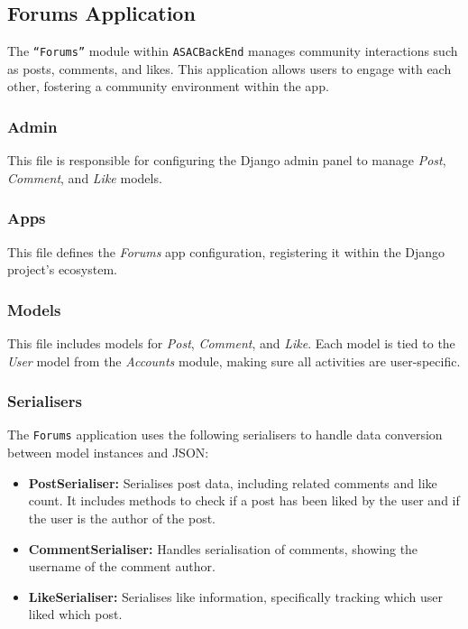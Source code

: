 \subsection{Forums Application}

The \texttt{``Forums''} module within \texttt{ASACBackEnd} manages community interactions such as posts, comments, and likes. This application allows users to engage with each other, fostering a community environment within the app.

\subsubsection{Admin}

This file is responsible for configuring the Django admin panel to manage \textit{Post}, \textit{Comment}, and \textit{Like} models.

\subsubsection{Apps}

This file defines the \textit{Forums} app configuration, registering it within the Django project's ecosystem.

\subsubsection{Models} 

This file includes models for \textit{Post}, \textit{Comment}, and \textit{Like}. Each model is tied to the \textit{User} model from the \textit{Accounts} module, making sure all activities are user-specific.

\subsubsection{Serialisers}

The \texttt{Forums} application uses the following serialisers to handle data conversion between model instances and JSON:
\begin{itemize}
    \item \textbf{PostSerialiser:} Serialises post data, including related comments and like count. It includes methods to check if a post has been liked by the user and if the user is the author of the post.
    \item \textbf{CommentSerialiser:} Handles serialisation of comments, showing the username of the comment author.
    \item \textbf{LikeSerialiser:} Serialises like information, specifically tracking which user liked which post.
\end{itemize}

